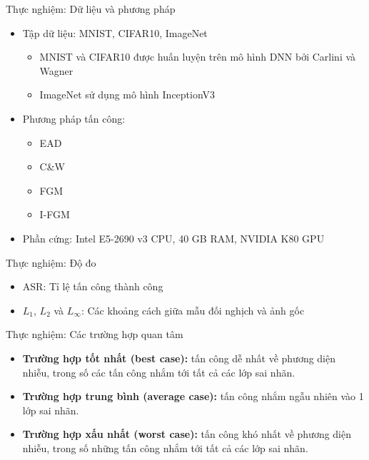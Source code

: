 \begin{frame}{Thực nghiệm: Dữ liệu và phương pháp}
    \begin{itemize}
        \item Tập dữ liệu: MNIST, CIFAR10, ImageNet
        \begin{itemize}
            \item MNIST và CIFAR10 được huấn luyện trên mô hình DNN bởi Carlini và Wagner
            \item ImageNet sử dụng mô hình InceptionV3
        \end{itemize}
        \item Phương pháp tấn công:
        \begin{itemize}
            \item EAD
            \item C\&W
            \item FGM
            \item I-FGM
        \end{itemize}
        \item Phần cứng: Intel E5-2690 v3 CPU, 40 GB RAM, NVIDIA K80 GPU
    \end{itemize}
\end{frame}

\begin{frame}{Thực nghiệm: Độ đo}
    \begin{itemize}
        \item ASR: Tỉ lệ tấn công thành công
        \item $L_1$, $L_2$ và $L_{\infty}$: Các khoảng cách giữa mẫu đối nghịch và ảnh gốc
    \end{itemize}
\end{frame}

\begin{frame}{Thực nghiệm: Các trường hợp quan tâm}
    \begin{itemize}
        \item \textbf{Trường hợp tốt nhất (best case):} tấn công dễ nhất về phương diện nhiễu, trong số các tấn công nhắm tới tất cả các lớp sai nhãn.
        \item \textbf{Trường hợp trung bình (average case):} tấn công nhắm ngẫu nhiên vào 1 lớp sai nhãn.
        \item \textbf{Trường hợp xấu nhất (worst case):} tấn công khó nhất về phương diện nhiễu, trong số những tấn công nhắm tới tất cả các lớp sai nhãn.
    \end{itemize}
\end{frame}

